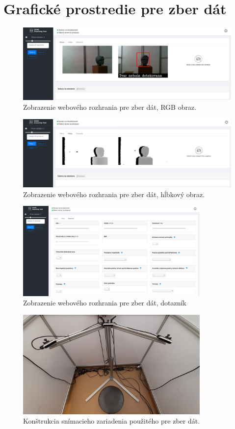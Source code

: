 \newpage
\section{Grafické prostredie pre zber dát} \label{sec:Priloha:HMI_WEB}

\begin{figure}[H]
	\centering
	\includegraphics[width=\textwidth]{figures/hmi_web1.png}
	\caption{Zobrazenie webového rozhrania pre zber dát, RGB obraz.}
	\label{fig:hmi_web:a}
\end{figure}

\begin{figure}[H]
	\centering
	\includegraphics[width=\textwidth]{figures/hmi_web2.png}
	\caption{Zobrazenie webového rozhrania pre zber dát, hĺbkový obraz.}
	\label{fig:hmi_web:b}
\end{figure}

\begin{figure}[H]
	\centering
	\includegraphics[width=0.85\textwidth]{figures/hmi_web3.png}
	\caption{Zobrazenie webového rozhrania pre zber dát, dotazník}
	\label{fig:hmi_web:c}
\end{figure}

\begin{figure}[H]
	\centering
	\includegraphics[width=0.85\textwidth]{figures/clinic_scaning.png}
	\caption{Konštrukcia snímacieho zariadenia použitého pre zber dát.}
	\label{fig:hmi_web:d}
\end{figure}
